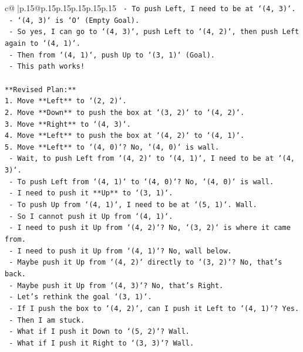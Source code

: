 \documentclass{article}
\begin{document}
{\begin{supertabular}{c@{$\;$}|p{.15\linewidth}@{}p{.15\linewidth}p{.15\linewidth}p{.15\linewidth}p{.15\linewidth}p{.15\linewidth}}
{{{\texttt{  {-} To push Left, I need to be at `(4, 3)`.} \\
\texttt{  {-} `(4, 3)` is `O` (Empty Goal).} \\
\texttt{  {-} So yes, I can go to `(4, 3)`, push Left to `(4, 2)`, then push Left again to `(4, 1)`.} \\
\texttt{  {-} Then from `(4, 1)`, push Up to `(3, 1)` (Goal).} \\
\texttt{  {-} This path works!} \\
\\ 
\texttt{**Revised Plan:**} \\
\texttt{1.  Move **Left** to `(2, 2)`.} \\
\texttt{2.  Move **Down** to push the box at `(3, 2)` to `(4, 2)`.} \\
\texttt{3.  Move **Right** to `(4, 3)`.} \\
\texttt{4.  Move **Left** to push the box at `(4, 2)` to `(4, 1)`.} \\
\texttt{5.  Move **Left** to `(4, 0)`? No, `(4, 0)` is wall.} \\
\texttt{    {-} Wait, to push Left from `(4, 2)` to `(4, 1)`, I need to be at `(4, 3)`.} \\
\texttt{    {-} To push Left from `(4, 1)` to `(4, 0)`? No, `(4, 0)` is wall.} \\
\texttt{    {-} I need to push it **Up** to `(3, 1)`.} \\
\texttt{    {-} To push Up from `(4, 1)`, I need to be at `(5, 1)`. Wall.} \\
\texttt{    {-} So I cannot push it Up from `(4, 1)`.} \\
\texttt{    {-} I need to push it Up from `(4, 2)`? No, `(3, 2)` is where it came from.} \\
\texttt{    {-} I need to push it Up from `(4, 1)`? No, wall below.} \\
\texttt{    {-} Maybe push it Up from `(4, 2)` directly to `(3, 2)`? No, that's back.} \\
\texttt{    {-} Maybe push it Up from `(4, 3)`? No, that's Right.} \\
\texttt{    {-} Let's rethink the goal `(3, 1)`.} \\
\texttt{    {-} If I push the box to `(4, 2)`, can I push it Left to `(4, 1)`? Yes.} \\
\texttt{    {-} Then I am stuck.} \\
\texttt{    {-} What if I push it Down to `(5, 2)`? Wall.} \\
\texttt{    {-} What if I push it Right to `(3, 3)`? Wall.} \\
}}}
\end{supertabular}}
\end{document}

